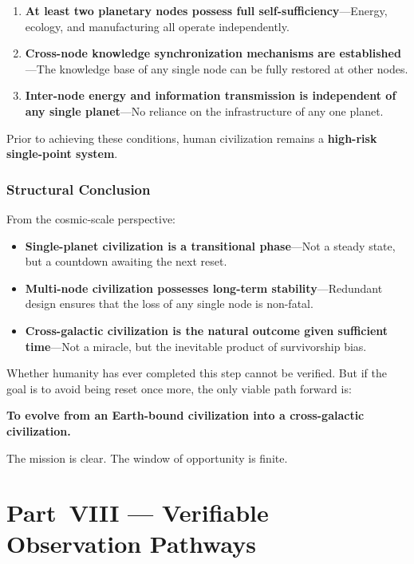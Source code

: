 \documentclass[aps,prd,twocolumn,superscriptaddress,nofootinbib]{revtex4-2}
\begin{document}
\begin{enumerate}
  \item \textbf{At least two planetary nodes possess full self-sufficiency}---Energy, ecology, and manufacturing all operate independently.
  \item \textbf{Cross-node knowledge synchronization mechanisms are established}---The knowledge base of any single node can be fully restored at other nodes.
  \item \textbf{Inter-node energy and information transmission is independent of any single planet}---No reliance on the infrastructure of any one planet.
\end{enumerate}

Prior to achieving these conditions, human civilization remains a \textbf{high-risk single-point system}.

\subsubsection{Structural Conclusion}\label{sec:structural-conclusion}

From the cosmic-scale perspective:

\begin{itemize}
  \item \textbf{Single-planet civilization is a transitional phase}---Not a steady state, but a countdown awaiting the next reset.
  \item \textbf{Multi-node civilization possesses long-term stability}---Redundant design ensures that the loss of any single node is non-fatal.
  \item \textbf{Cross-galactic civilization is the natural outcome given sufficient time}---Not a miracle, but the inevitable product of survivorship bias.
\end{itemize}

Whether humanity has ever completed this step cannot be verified. But if the goal is to avoid being reset once more, the only viable path forward is:

\textbf{To evolve from an Earth-bound civilization into a cross-galactic civilization.}

The mission is clear. The window of opportunity is finite.


\section{Part~VIII --- Verifiable Observation Pathways}\label{sec:part8}
\end{document}

